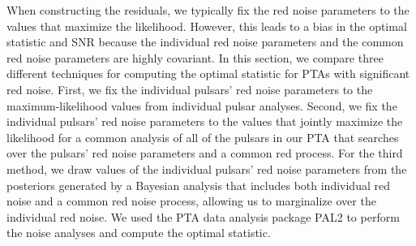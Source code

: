 \documentclass[twocolumn,aps,prd,superscriptaddress]{revtex4-1}
\begin{document}
When constructing the residuals, 
we typically fix the red noise parameters to the values that 
maximize the likelihood. 
However, this leads to a bias in the optimal statistic and SNR because 
the individual red noise parameters and the common red noise parameters 
are highly covariant. 
In this section, we compare three different techniques for computing the 
optimal statistic for PTAs with significant red noise. 
First, we fix the individual pulsars' red noise parameters to the 
maximum-likelihood values from individual pulsar analyses. 
Second, we fix the individual pulsars' red noise parameters to the 
values that jointly maximize the likelihood for a common analysis 
of all of the pulsars in our PTA 
that searches over the pulsars' red noise parameters and 
a common red process. 
For the third method, we draw values of the individual pulsars' 
red noise parameters from the posteriors generated by a Bayesian analysis 
that includes both individual red noise and a common red noise process, 
allowing us to marginalize over the individual red noise. 
We used the PTA data analysis package 
PAL2 %
\citep{evh17a}
to perform the noise analyses and compute the optimal statistic.
\end{document}
